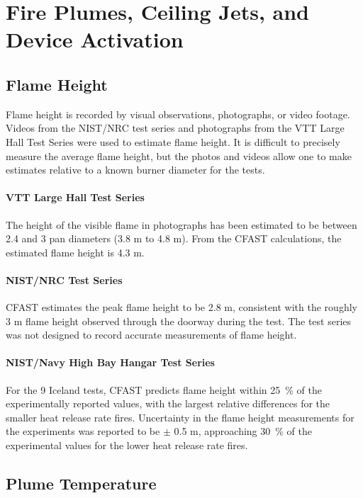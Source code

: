 \chapter{Fire Plumes, Ceiling Jets, and Device Activation}

\section{Flame Height}

Flame height is recorded by visual observations, photographs, or video footage.  Videos from the NIST/NRC test series and photographs from the VTT Large Hall Test Series were used to estimate flame height.  It is difficult to precisely measure the average flame height, but the photos and videos allow one to make estimates relative to a known burner diameter for the tests.

\subsubsection{VTT Large Hall Test Series}

The height of the visible flame in  photographs has been estimated to be between 2.4 and 3 pan diameters (3.8 m to 4.8 m).  From the CFAST calculations, the estimated flame height is 4.3 m.

\subsubsection{NIST/NRC Test Series}

CFAST estimates the peak flame height to be 2.8 m, consistent with the roughly 3 m flame height observed through the doorway during the test.  The test series was not designed to record accurate measurements of flame height.

\subsubsection{NIST/Navy High Bay Hangar Test Series}

For the 9 Iceland tests, CFAST predicts flame height within 25~\% of the experimentally reported values, with the largest relative differences for the smaller heat release rate fires. Uncertainty in the flame height measurements for the experiments was reported to be $\pm$ 0.5 m, approaching 30~\% of the experimental values for the lower heat release rate fires.

\section{Plume Temperature}

